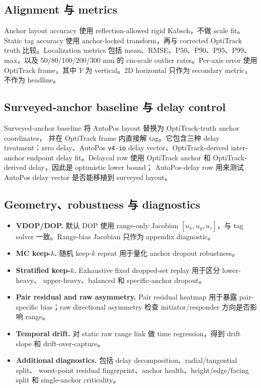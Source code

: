 \documentclass[11pt,a4paper]{article}
\begin{document}
\subsection{Alignment 与 metrics}
Anchor layout accuracy 使用 reflection-allowed rigid Kabsch，不做 scale fit。Static tag
accuracy 使用 anchor-locked transform，再与 corrected OptiTrack truth 比较。Localization
metrics 包括 mean、RMSE、P50、P90、P95、P99、max，以及 50/80/100/200/300 mm 的 cm-scale
outlier rates。Per-axis error 使用 OptiTrack frame，其中 $Y$ 为 vertical。2D horizontal
只作为 secondary metric，不作为 headline。

\subsection{Surveyed-anchor baseline 与 delay control}
Surveyed-anchor baseline 将 AutoPos layout 替换为 OptiTrack-truth anchor coordinates，
并在 OptiTrack frame 内直接解 tag。它包含三种 delay treatment：zero delay、AutoPos
\texttt{v4-io} delay vector、OptiTrack-derived inter-anchor endpoint delay fit。Delaycal
row 使用 OptiTrack anchor 和 OptiTrack-derived delay，因此是 optimistic lower bound；
AutoPos-delay row 用来测试 AutoPos delay vector 是否能移植到 surveyed layout。

\subsection{Geometry、robustness 与 diagnostics}
\begin{itemize}[leftmargin=1.4em]
  \item \textbf{VDOP/DOP.} 默认 DOP 使用 range-only Jacobian $[u_x,u_y,u_z]$，与 tag solver
        一致。Range-bias Jacobian 只作为 appendix diagnostic。
  \item \textbf{MC keep-$k$.} 随机 keep-$k$ repeat 用于量化 anchor dropout robustness。
  \item \textbf{Stratified keep-$k$.} Exhaustive fixed dropped-set replay 用于区分 lower-heavy、
        upper-heavy、balanced 和 specific-anchor dropout。
  \item \textbf{Pair residual and raw asymmetry.} Pair residual heatmap 用于暴露 pair-specific
        bias；raw directional asymmetry 检查 initiator/responder 方向是否影响 range。
  \item \textbf{Temporal drift.} 对 static raw range link 做 time regression，得到 drift slope
        和 drift-over-capture。
  \item \textbf{Additional diagnostics.} 包括 delay decomposition、radial/tangential split、
        worst-point residual fingerprint、anchor health、height/edge/facing split 和
        single-anchor criticality。
\end{itemize}
\end{document}
